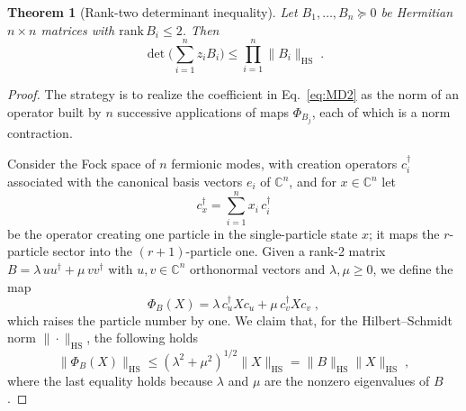 \documentclass[aps,prl,twocolumn,superscriptaddress,reprint,longbibliography,nofootinbib]{revtex4-2}
\newtheorem{theorem}{Theorem}
\begin{document}
\begin{theorem}[Rank-two determinant inequality]
\label{thm:MD2}
Let $B_1,\dots,B_n\succeq0$ be Hermitian $n\times n$ matrices with $\mathrm{rank}\,B_i\le2$. Then
\begin{equation}
    [z_1\cdots z_n]\det\!\Big(\sum_{i=1}^nz_iB_i\Big)\le\prod_{i=1}^n\|B_i\|_{\mathrm{HS}}\;.
    \label{eq:MD2}
\end{equation}
\end{theorem}

\begin{proof}
The strategy is to realize the coefficient in Eq.~\eqref{eq:MD2} as the norm of an operator built by $n$ successive applications of maps $\Phi_{B_j}$, each of which is a norm contraction.

Consider the Fock space of $n$ fermionic modes, with creation operators $c_i^\dagger$ associated with the canonical basis vectors $e_i$ of $\mathbb{C}^n$, and for $x\in\mathbb{C}^n$ let
\begin{equation}
  c_x^\dagger=\sum_{i=1}^n x_i\,c_i^\dagger
\end{equation} 
be the operator creating one particle in the single-particle state $x$; it maps the $r$-particle sector into the $(r+1)$-particle one. Given a rank-2 matrix $B=\lambda\,uu^\dagger+\mu\,vv^\dagger$ with $u,v \in \mathbb{C}^n$ orthonormal vectors and $\lambda,\mu\ge0$, we define the map
\begin{equation}
    \Phi_B(X)=\lambda\,c_u^\dagger Xc_u+\mu\,c_v^\dagger Xc_v\;,
\end{equation}
which raises the particle number by one.
We claim that, for the Hilbert--Schmidt norm $\|\cdot\|_{\mathrm{HS}}$, the following holds
\begin{equation}\|\Phi_B(X)\|_{\mathrm{HS}}\le(\lambda^2+\mu^2)^{1/2}\|X\|_{\mathrm{HS}}=\|B\|_{\mathrm{HS}}\|X\|_{\mathrm{HS}}\;,
    \label{eq:Phi-contraction}
\end{equation}
where the last equality holds because $\lambda$ and $\mu$ are the nonzero eigenvalues of $B$.


\end{proof}
\end{document}
